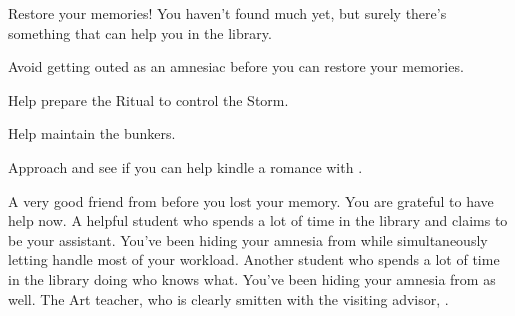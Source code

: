 \documentclass[char]{GL2020}
\begin{document}
\begin{itemz}[Goals]
	\item Restore your memories! You haven’t found much yet, but surely there’s something that can help you in the library.
	\item Avoid getting outed as an amnesiac before you can restore your memories.
	\item Help prepare the Ritual to control the Storm.
	\item Help maintain the bunkers.
	\item Approach \cChupAvenger{} and see if you can help \cChupAvenger{\them} kindle a romance with \cHeadScientist{}.
\end{itemz}

\begin{itemz}[Notes]
	\item 
\end{itemz}

\begin{contacts}
	\contact{\cEthics{}} A very good friend from before you lost your memory. You are grateful to have \cEthics{\their} help now.
	\contact{\cLibAssist{}} A helpful student who spends a lot of time in the library and claims to be your assistant. You’ve been hiding your amnesia from \cLibAssist{\them} while simultaneously letting \cLibAssist{\them} handle most of your workload.
	\contact{\cPresident{}} Another student who spends a lot of time in the library doing who knows what. You’ve been hiding your amnesia from \cPresident{\them} as well.
	\contact{\cChupAvenger{}} The Art teacher, who is clearly smitten with the visiting advisor, \cHeadScientist{}.
\end{contacts}
\end{document}
